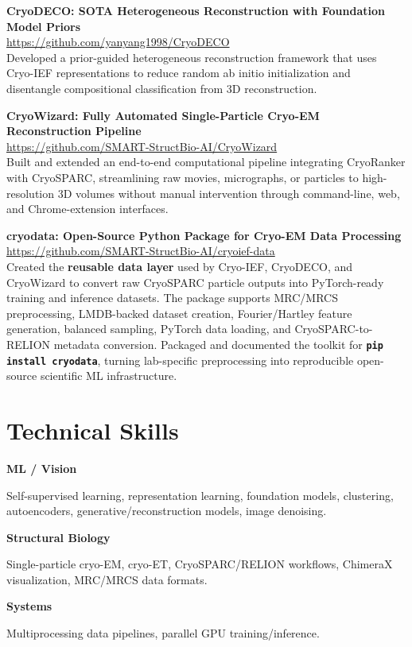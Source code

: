 \documentclass[10pt,letterpaper]{article}
\newcommand{\projectentry}[4]{%
  \Needspace{4.4\baselineskip}%
  \noindent
  \begin{minipage}[t]{0.14\linewidth}
    \vspace{0pt}{\small\color{Muted}#1}
  \end{minipage}\hfill
  \begin{minipage}[t]{0.83\linewidth}
    \vspace{0pt}\RaggedRight
    \textbf{#2}\\[-1pt]
    {\small\href{#3}{#3}}\\[-1pt]
    #4
  \end{minipage}\par\vspace{4pt}
}
\newcommand{\skillrow}[2]{%
  \noindent
  \begin{minipage}[t]{0.24\linewidth}
    \vspace{0pt}\textbf{#1}
  \end{minipage}\hfill
  \begin{minipage}[t]{0.735\linewidth}
    \vspace{0pt}#2
  \end{minipage}\par\vspace{2pt}
}
\begin{document}
\projectentry{2024--2026}{CryoDECO: SOTA Heterogeneous Reconstruction with Foundation Model Priors}{https://github.com/yanyang1998/CryoDECO}{Developed a prior-guided heterogeneous reconstruction framework that uses Cryo-IEF representations to reduce random ab initio initialization and disentangle compositional classification from 3D reconstruction.} 

\projectentry{2024--2025}{CryoWizard: Fully Automated Single-Particle Cryo-EM Reconstruction Pipeline}{https://github.com/SMART-StructBio-AI/CryoWizard}{Built and extended an end-to-end computational pipeline integrating CryoRanker with CryoSPARC, streamlining raw movies, micrographs, or particles to high-resolution 3D volumes without manual intervention through command-line, web, and Chrome-extension interfaces.}

\projectentry{2023--2026}{cryodata: Open-Source Python Package for Cryo-EM Data Processing}{https://github.com/SMART-StructBio-AI/cryoief-data}{Created the \textbf{reusable data layer} used by Cryo-IEF, CryoDECO, and CryoWizard to convert raw CryoSPARC particle outputs into PyTorch-ready training and inference datasets. The package supports MRC/MRCS preprocessing, LMDB-backed dataset creation, Fourier/Hartley feature generation, balanced sampling, PyTorch data loading, and CryoSPARC-to-RELION metadata conversion. Packaged and documented the toolkit for \textbf{\texttt{pip install cryodata}}, turning lab-specific preprocessing into reproducible open-source scientific ML infrastructure.}

\section*{Technical Skills}
\skillrow{ML / Vision}{Self-supervised learning, representation learning, foundation models, clustering, autoencoders, generative/reconstruction models, image denoising.}
\skillrow{Structural Biology}{Single-particle cryo-EM, cryo-ET, CryoSPARC/RELION workflows, ChimeraX visualization, MRC/MRCS data formats.}
\skillrow{Systems}{Multiprocessing data pipelines, parallel GPU training/inference.}
\end{document}
